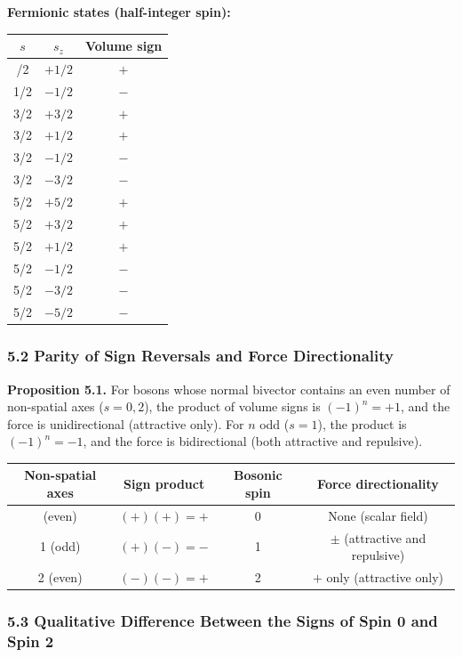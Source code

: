 \documentclass[a4paper,11pt]{article}
\newcounter{none}
\begin{document}
\textbf{Fermionic states (half-integer spin):}

{\def\LTcaptype{none}
\begin{longtable}[]{@{}ccc@{}}
\toprule
$s$ & $s_z$ & Volume sign \\
\midrule
\endhead
\bottomrule
\endlastfoot
1/2 & $+1/2$ & $+$ \\
1/2 & $-1/2$ & $-$ \\
3/2 & $+3/2$ & $+$ \\
3/2 & $+1/2$ & $+$ \\
3/2 & $-1/2$ & $-$ \\
3/2 & $-3/2$ & $-$ \\
5/2 & $+5/2$ & $+$ \\
5/2 & $+3/2$ & $+$ \\
5/2 & $+1/2$ & $+$ \\
5/2 & $-1/2$ & $-$ \\
5/2 & $-3/2$ & $-$ \\
5/2 & $-5/2$ & $-$ \\
\end{longtable}
}

\subsubsection*{5.2 Parity of Sign Reversals and Force Directionality}

\textbf{Proposition 5.1.} For bosons whose normal bivector contains an even number of non-spatial axes ($s = 0, 2$), the product of volume signs is $(-1)^n = +1$, and the force is unidirectional (attractive only). For $n$ odd ($s = 1$), the product is $(-1)^n = -1$, and the force is bidirectional (both attractive and repulsive).

{\def\LTcaptype{none}
\begin{longtable}[]{@{}cccc@{}}
\toprule
Non-spatial axes & Sign product & Bosonic spin & Force directionality \\
\midrule
\endhead
\bottomrule
\endlastfoot
0 (even) & $(+)(+) = +$ & 0 & None (scalar field) \\
1 (odd) & $(+)(-) = -$ & 1 & $\pm$ (attractive and repulsive) \\
2 (even) & $(-)(-) = +$ & 2 & $+$ only (attractive only) \\
\end{longtable}
}

\subsubsection*{5.3 Qualitative Difference Between the Signs of Spin 0 and Spin 2}
\end{document}
